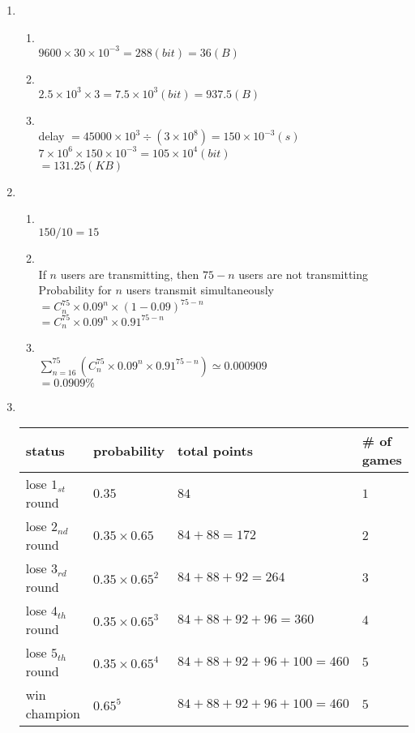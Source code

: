 \documentclass[10pt, a4paper]{article}
\begin{document}
\begin{enumerate}
\item\mbox{}\\
    \begin{enumerate}
    \item\mbox{}\\
        $9600 \times 30 \times 10^{-3} = 288 (bit) = 36 (B)$
    \item\mbox{}\\
        $2.5 \times 10^3 \times 3 = 7.5 \times 10^3 (bit) = 937.5 (B)$
    \item\mbox{}\\
        delay $= 45000 \times 10^3 \div (3 \times 10^8) = 150 \times 10^{-3} (s)$\\
        $7 \times 10^6 \times 150 \times 10^{-3} = 105 \times 10^4 (bit)$\\
        $= 131.25 (KB)$
    \end{enumerate}

\item\mbox{}\\
    \begin{enumerate}
    \item\mbox{}\\
        $150 / 10 = 15$
    \item\mbox{}\\
        If $n$ users are transmitting, then $75 - n$ users are not transmitting\\
        Probability for $n$ users transmit simultaneously $= C_{n}^{75} \times 0.09^n \times \left(1 - 0.09\right)^{75-n}$\\
        $= C_{n}^{75} \times 0.09^n \times 0.91^{75-n}$
    \item\mbox{}\\
        $\displaystyle\sum_{n=16}^{75} \left(C_{n}^{75} \times 0.09^n \times 0.91^{75-n}\right) \simeq 0.000909$\\
        $=  0.0909\%$
    \end{enumerate}

\item\mbox{}\\
    \begin{tabular}{llll}
    \toprule
    status & probability & total points & \# of games\\
    \midrule
    lose $1_{st}$ round & $0.35$ & $84$ & $1$\\
    lose $2_{nd}$ round & $0.35 \times 0.65$ & $84 + 88 = 172$ & $2$\\
    lose $3_{rd}$ round & $0.35 \times 0.65^2$ & $84 + 88 + 92 = 264$ & $3$\\
    lose $4_{th}$ round & $0.35 \times 0.65^3$ & $84 + 88 + 92 + 96 = 360$ & $4$\\
    lose $5_{th}$ round & $0.35 \times 0.65^4$ & $84 + 88 + 92 + 96 + 100 = 460$ & $5$\\
    win champion & $0.65^5$ & $84 + 88 + 92 + 96 + 100 = 460$ & $5$\\
    \bottomrule
    \end{tabular}
    \begin{enumerate}


\end{enumerate}
\end{enumerate}
\end{document}
